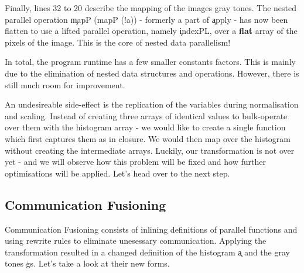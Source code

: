     
    Finally, lines 32 to 20 describe the mapping of the images gray tones.
    The nested parallel operation \c{mapP (mapP (!a))} - formerly a part of \c{apply} - 
    has now been flatten to use a lifted parallel operation, namely \c{indexPL}, over a \textbf{flat} array of
    the pixels of the image. This is the core of nested data parallelism!
    
    In total, the program runtime has a few smaller constants factors. This is mainly due to the elimination of nested data structures
    and operations. However, there is still much room for improvement.
    
    An undesireable side-effect
    is the replication of the variables during normalisation and scaling. Instead of creating three arrays of identical values
    to bulk-operate over them with the histogram array - we would like to create a single function which first
    captures them as in closure. We would then map over the histogram without creating the intermediate arrays.
    Luckily, our transformation is not over yet - and we will observe how this problem will be fixed and how further optimisations will be applied.
    Let's head over to the next step.
    
  \subsection{Communication Fusioning}
    
    Communication Fusioning consists of inlining definitions of parallel functions and using rewrite rules to eliminate
    unesessary communication. Applying the transformation resulted in a changed definition of the histogram \c{a} and the
    gray tones \c{gs}. Let's take a look at their new forms.
    

